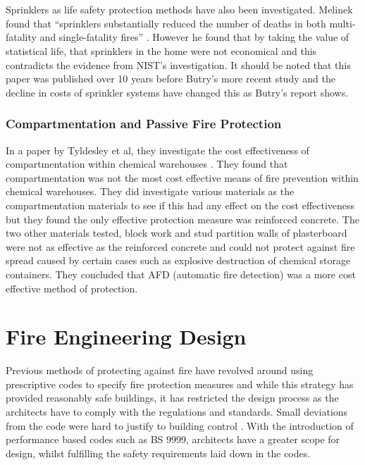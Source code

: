 \documentclass[table,a4paper,oneside]{book}
\begin{document}
\\
\\
Sprinklers as life safety protection methods have also been investigated. Melinek found that ``sprinklers substantially reduced the number of deaths in both multi-fatality and single-fatality fires'' \citep{Melinek1993}. However he found that by taking the value of statistical life, that sprinklers in the home were not economical and this contradicts the evidence from NIST's investigation. It should be noted that this paper was published over 10 years before Butry's more recent study and the decline in costs of sprinkler systems have changed this as Butry's report shows.
\subsubsection{Compartmentation and Passive Fire Protection}
In a paper by Tyldesley et al, they investigate the cost effectiveness of compartmentation within chemical warehouses \citep{Tyldesley2004331}. They found that compartmentation was not the most cost effective means of fire prevention within chemical warehouses. They did investigate various materials as the compartmentation materials to see if this had any effect on the cost effectiveness but they found the only effective protection measure was reinforced concrete. The two other materials tested, block work and stud partition walls of plasterboard were not as effective as the reinforced concrete and could not protect against fire spread caused by certain cases such as explosive destruction of chemical storage containers. They concluded that AFD (automatic fire detection) was a more cost effective method of protection.
\section{Fire Engineering Design}
Previous methods of protecting against fire have revolved around using prescriptive codes to specify fire protection measures and while this strategy has provided reasonably safe buildings, it has restricted the design process as the architects have to comply with the regulations and standards. Small deviations from the code were hard to justify to building control \citep{Alfawakhiri2005}. With the introduction of performance based codes such as BS 9999, architects have a greater scope for design, whilst fulfilling the safety requirements laid down in the codes.
\end{document}
